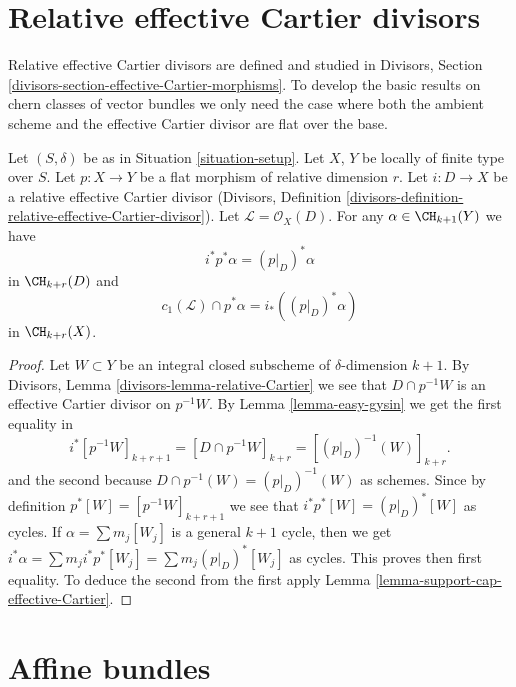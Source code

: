 \section{Relative effective Cartier divisors}
\label{section-relative-effective-cartier}

\noindent
Relative effective Cartier divisors are defined and studied
in Divisors, Section \ref{divisors-section-effective-Cartier-morphisms}.
To develop the basic results on chern classes of vector bundles
we only need the case where both the ambient scheme and the effective
Cartier divisor are flat over the base.

\begin{lemma}
\label{lemma-relative-effective-cartier}
Let $(S, \delta)$ be as in Situation \ref{situation-setup}.
Let $X$, $Y$ be locally of finite type over $S$.
Let $p : X \to Y$ be a flat morphism of relative dimension $r$.
Let $i : D \to X$ be a relative effective Cartier divisor
(Divisors, Definition
\ref{divisors-definition-relative-effective-Cartier-divisor}).
Let $\mathcal{L} = \mathcal{O}_X(D)$.
For any $\alpha \in \CH_{k + 1}(Y)$ we have
$$
i^*p^*\alpha = (p|_D)^*\alpha
$$
in $\CH_{k + r}(D)$ and
$$
c_1(\mathcal{L}) \cap p^*\alpha = i_* ((p|_D)^*\alpha)
$$
in $\CH_{k + r}(X)$.
\end{lemma}

\begin{proof}
Let $W \subset Y$ be an integral closed subscheme of $\delta$-dimension
$k + 1$. By Divisors, Lemma \ref{divisors-lemma-relative-Cartier}
we see that $D \cap p^{-1}W$ is an effective
Cartier divisor on $p^{-1}W$. By Lemma \ref{lemma-easy-gysin}
we get the first equality in
$$
i^*[p^{-1}W]_{k + r + 1} =
[D \cap p^{-1}W]_{k + r} =
[(p|_D)^{-1}(W)]_{k + r}.
$$
and the second because $D \cap p^{-1}(W) = (p|_D)^{-1}(W)$ as schemes.
Since by definition $p^*[W] = [p^{-1}W]_{k + r + 1}$ we see that
$i^*p^*[W] = (p|_D)^*[W]$ as cycles. If $\alpha = \sum m_j[W_j]$ is a
general $k + 1$ cycle, then we get
$i^*\alpha = \sum m_j i^*p^*[W_j] = \sum m_j(p|_D)^*[W_j]$ as cycles.
This proves then first equality. To deduce the second from the
first apply Lemma \ref{lemma-support-cap-effective-Cartier}.
\end{proof}








\section{Affine bundles}
\label{section-affine-vector}

